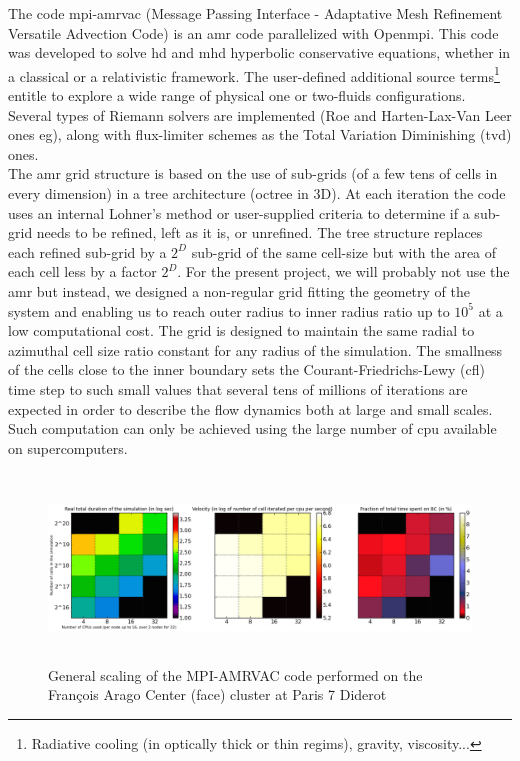 \documentclass[
    a4paper, 
    12pt, onecolumn,
]{article}
\begin{document}
\indent The code {\sc mpi-amrvac} \citep{Porth:2014wv} (Message Passing Interface - Adaptative Mesh Refinement Versatile Advection Code) is an {\sc amr} code parallelized with Open{\sc mpi}. This code was developed to solve {\sc hd} and {\sc mhd} hyperbolic conservative equations, whether in a classical or a relativistic framework. The user-defined additional source terms\footnote{Radiative cooling (in optically thick or thin regims), gravity, viscosity...} entitle to explore a wide range of physical one or two-fluids configurations. Several types of R{\sc iemann} solvers are implemented (R{\sc oe} and H{\sc arten}-L{\sc ax}-V{\sc an} L{\sc eer} ones eg), along with flux-limiter schemes as the Total Variation Diminishing ({\sc tvd}) ones.\\
\indent The {\sc amr} grid structure is based on the use of sub-grids (of a few tens of cells in every dimension) in a tree architecture (octree in 3D). At each iteration the code uses an internal L{\sc ohner}'s method or user-supplied criteria to determine if a sub-grid needs to be refined, left as it is, or unrefined. The tree structure replaces each refined sub-grid by a $2^D$ sub-grid of the same cell-size but with the area of each cell less by a factor $2^D$. For the present project, we will probably not use the {\sc amr} but instead, we designed a non-regular grid fitting the geometry of the system and enabling us to reach outer radius to inner radius ratio up to $10^5$ at a low computational cost. The grid is designed to maintain the same radial to azimuthal cell size ratio constant for any radius of the simulation. The smallness of the cells close to the inner boundary sets the C{\sc ourant}-F{\sc riedrichs}-L{\sc ewy} ({\sc cfl}) time step to such small values that several tens of millions of iterations are expected in order to describe the flow dynamics both at large and small scales. Such computation can only be achieved using the large number of {\sc cpu} available on supercomputers.
\newline

 \begin{figure}
\centering
 \includegraphics[width=14cm,height=5cm]{Scaling_node_14_15_unthreaded.png} 
 \caption{General scaling of the MPI-AMRVAC code performed on the Fran\c cois Arago Center ({\sc fac}e) cluster at Paris 7 Diderot} 
 \label{fig:scaling_FACe}
\end{figure}
\end{document}
